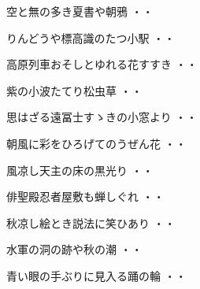 \begin{shiika}空と無の多き夏書や朝鴉
\hfill{・・}\end{shiika}
\vspace{0.6cm}
\begin{shiika}りんどうや標高識のたつ小駅
\hfill{・・}\end{shiika}
\vspace{0.6cm}
\begin{shiika}高原列車おそしとゆれる花すすき
\hfill{・・}\end{shiika}
\vspace{0.6cm}
\begin{shiika}紫の小波たてり松虫草
\hfill{・・}\end{shiika}
\vspace{0.6cm}
\begin{shiika}思はざる遠冨士すゝきの小窓より
\hfill{・・}\end{shiika}
\vspace{0.6cm}
\begin{shiika}朝風に彩をひろげてのうぜん花
\hfill{・・}\end{shiika}
\vspace{0.6cm}
\begin{shiika}風凉し天主の床の黒光り
\hfill{・・}\end{shiika}
\vspace{0.6cm}
\begin{shiika}俳聖殿忍者屋敷も蝉しぐれ
\hfill{・・}\end{shiika}
\vspace{0.6cm}
\begin{shiika}秋凉し絵とき説法に笑ひあり
\hfill{・・}\end{shiika}
\vspace{0.6cm}
\begin{shiika}水軍の洞の跡や秋の潮
\hfill{・・}\end{shiika}
\vspace{0.6cm}
\begin{shiika}青い眼の手ぶりに見入る踊の輪
\hfill{・・}\end{shiika}
\vspace{0.6cm}
